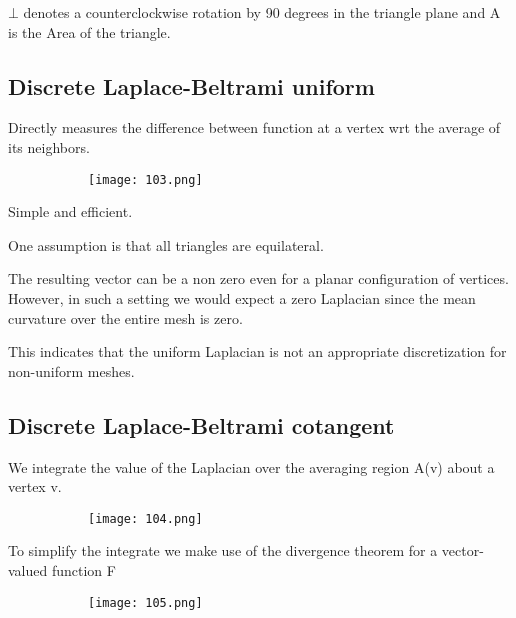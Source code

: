 \documentclass{article}
\begin{document}
$\bot$ denotes a counterclockwise rotation by 90 degrees in the triangle plane and A is the Area of the triangle.

\subsection{Discrete Laplace-Beltrami uniform}

Directly measures the difference between function at a vertex wrt the average of its neighbors.

    \begin{figure}[ht!]
  \centering
  \begin{subfigure}[b]{0.7\linewidth}
    \texttt{[image: 103.png]}
  \end{subfigure}
\end{figure}

Simple and efficient.

One assumption is that all triangles are equilateral.

The resulting vector can be a non zero even for a planar configuration of vertices. However, in such a setting we would expect a zero Laplacian since the mean curvature over the entire mesh is zero.

This indicates that the uniform Laplacian is not an appropriate discretization for non-uniform meshes.


\subsection{Discrete Laplace-Beltrami cotangent}

We integrate the value of the Laplacian over the averaging region A(v) about a vertex v.

    \begin{figure}[ht!]
  \centering
  \begin{subfigure}[b]{0.7\linewidth}
    \texttt{[image: 104.png]}
  \end{subfigure}
\end{figure}

To simplify the integrate we make use of the divergence theorem for a vector-valued function F


    \begin{figure}[ht!]
  \centering
  \begin{subfigure}[b]{0.7\linewidth}
    \texttt{[image: 105.png]}
  \end{subfigure}
\end{figure}
\end{document}
